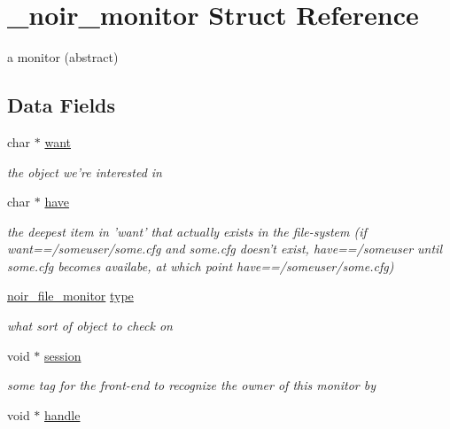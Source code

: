 \hypertarget{struct__noir__monitor}{
\section{\_\-noir\_\-monitor Struct Reference}
\label{struct__noir__monitor}
}
a monitor (abstract)  


\subsection*{Data Fields}
\begin{CompactItemize}
\item 
\hypertarget{struct__noir__monitor_o0}{
char $\ast$ \hyperlink{struct__noir__monitor_o0}{want}}
\label{struct__noir__monitor_o0}

\begin{CompactList}\small\item\em the object we're interested in \item\end{CompactList}\item 
\hypertarget{struct__noir__monitor_o1}{
char $\ast$ \hyperlink{struct__noir__monitor_o1}{have}}
\label{struct__noir__monitor_o1}

\begin{CompactList}\small\item\em the deepest item in 'want' that actually exists in the file-system (if want==/someuser/some.cfg and some.cfg doesn't exist, have==/someuser until some.cfg becomes availabe, at which point have==/someuser/some.cfg) \item\end{CompactList}\item 
\hypertarget{struct__noir__monitor_o2}{
\hyperlink{monitors_8h_a21}{noir\_\-file\_\-monitor} \hyperlink{struct__noir__monitor_o2}{type}}
\label{struct__noir__monitor_o2}

\begin{CompactList}\small\item\em what sort of object to check on \item\end{CompactList}\item 
\hypertarget{struct__noir__monitor_o3}{
void $\ast$ \hyperlink{struct__noir__monitor_o3}{session}}
\label{struct__noir__monitor_o3}

\begin{CompactList}\small\item\em some tag for the front-end to recognize the owner of this monitor by \item\end{CompactList}\item 
\hypertarget{struct__noir__monitor_o4}{
void $\ast$ \hyperlink{struct__noir__monitor_o4}{handle}}
\label{struct__noir__monitor_o4}


\end{CompactItemize}
